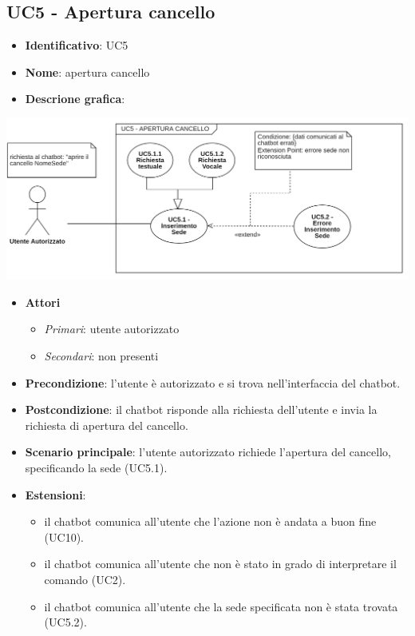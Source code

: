 \subsection{UC5 - Apertura cancello}
\begin{itemize}
    \item \textbf{Identificativo}: UC5
    \item \textbf{Nome}: apertura cancello
    \item \textbf{Descrione grafica}:
\end{itemize}

\begin{center}
    \includegraphics{images/UC5.png} 
\end{center} 

 \begin{itemize}
    \item \textbf{Attori}
 \begin{itemize} 
    \item \textit{Primari}: utente autorizzato
    \item \textit{Secondari}: non presenti
 \end{itemize}
 \item \textbf{Precondizione}: l'utente è autorizzato e si trova nell'interfaccia del chatbot.
 \item \textbf{Postcondizione}: il chatbot risponde alla richiesta dell'utente e invia la richiesta di apertura del cancello.
 \item \textbf{Scenario principale}: l'utente autorizzato richiede l'apertura del cancello, specificando la sede (UC5.1).
 \item \textbf{Estensioni}: 
 \begin{itemize} 
    \item il chatbot comunica all'utente che l'azione non è andata a buon fine (UC10).
    \item il chatbot comunica all'utente che non è stato in grado di interpretare il comando (UC2).
    \item il chatbot comunica all'utente che la sede specificata non è stata trovata (UC5.2).
 \end{itemize}
\end{itemize}
\newpage
